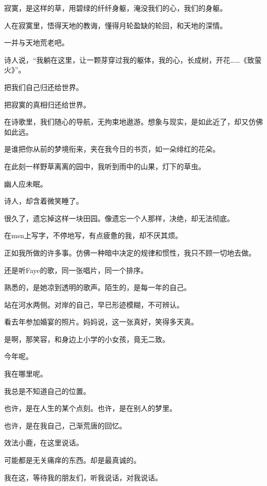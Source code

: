 \documentclass[12pt,a4paper]{article}
\def\blankrev{\vspace{1ex}}									%
\begin{document}
		\blankrev
		寂寞，是这样的草，用碧绿的纤纤身躯，淹没我们的心，我们的身躯。\par
		人在寂寞里，悟得天地的教诲，懂得月轮盈缺的轮回，和天地的深情。\par
		一并与天地荒老吧。\par
		诗人说，“我躺在这里，让一颗芽穿过我的躯体，我的心，长成树，开花……《致萤火》”。\par
		把我们自己归还给世界。\par
		把寂寞的真相归还给世界。\par
		在诗歌里，我们随心的导航，无拘束地遨游。想象与现实，是如此近了，却又仿佛如此远。

		\blankrev
		是谁把你从前的梦境衔来，夹在我今日的书页，如一朵绯红的花朵。\par
		在此刻一样野草离离的园中，我听到雨中的山果，灯下的草虫。\par
		幽人应未眠。\par
		诗人，却含着微笑睡了。

	\endwriting



		很久了，遗忘掉这样一块田园。像遗忘一个人那样，决绝，却无法彻底。\par
		在msn上写字，不停地写，有点疲惫的我，却不厌其烦。\par
		正如我所做的许多事。仿佛一种暗中决定的规律和惯性，我只不顾一切地去做。\par
		还是听Faye的歌，同一张唱片，同一个排序。\par
		熟悉的，是她凉到透明的歌声。陌生的，是每一年的自己。\par
		站在河水两侧。对岸的自己，早已形迹模糊，不可辨认。\par
		看去年参加婚宴的照片。妈妈说，这一张真好，笑得多天真。\par
		是啊，那笑容，和身边上小学的小女孩，竟无二致。\par
		今年呢。\par
		我在哪里呢。\par
		我总是不知道自己的位置。\par
		也许，是在人生的某个点刻。也许，是在别人的梦里。\par
		也许，是在我自己，己渐荒唐的回忆。

		\blankrev
		效法小鹿，在这里说话。\par
		可能都是无关痛痒的东西。却是最真诚的。

		我在这，等待我的朋友们，听我说话，对我说话。

	\endwriting
\end{document}
